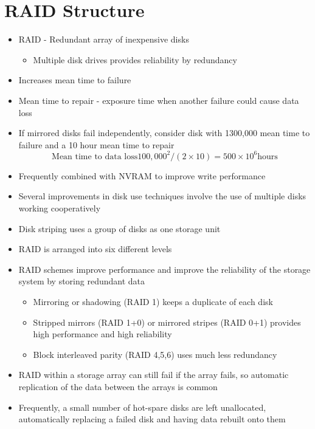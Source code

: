 \documentclass{article}[18pt]
\begin{document}
\section{RAID Structure}
\begin{itemize}
	\item RAID - Redundant array of inexpensive disks
	\begin{itemize}
		\item Multiple disk drives provides reliability by redundancy
	\end{itemize}
	\item Increases mean time to failure
	\item Mean time to repair - exposure time when another failure could cause data loss
	\item If mirrored disks fail independently, consider disk with 1300,000 mean time to failure and a 10 hour mean time to repair
	$$\text{Mean time to data loss} 100,000^2/(2\times 10)=500\times 10^6 \text{hours}$$
	\item Frequently combined with NVRAM to improve write performance
	\item Several improvements in disk use techniques involve the use of multiple disks working cooperatively
	\item Disk striping uses a group of disks as one storage unit
	\item RAID is arranged into six different levels
	\item RAID schemes improve performance and improve the reliability of the storage system by storing redundant data
	\begin{itemize}
		\item Mirroring or shadowing (RAID 1) keeps a duplicate of each disk
		\item Stripped mirrors (RAID 1+0) or mirrored stripes (RAID 0+1) provides high performance and high reliability
		\item Block interleaved parity (RAID 4,5,6) uses much less redundancy
	\end{itemize}
	\item RAID within a storage array can still fail if the array fails, so automatic replication of the data between the arrays is common
	\item Frequently, a small number of hot-spare disks are left unallocated, automatically replacing a failed disk and having data rebuilt onto them
\end{itemize}
\end{document}
